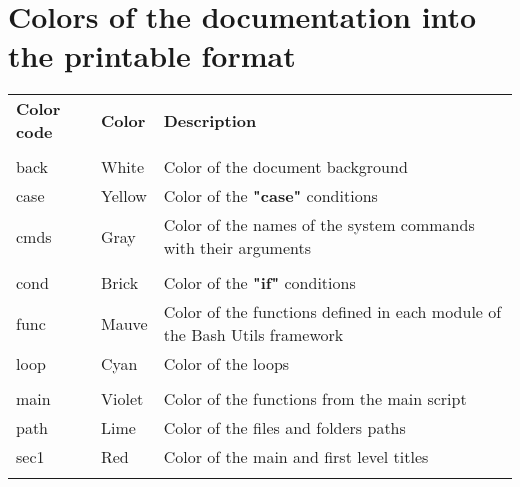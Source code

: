 \documentclass[a4paper,10pt]{article}
\begin{document}
    \newpage





    \color{red}
    \section{Colors of the documentation into the printable format}\color{text}

    \begin{justify}
        \begin{tabular}{lll}
            \textbf{Color code} & \textbf{Color}        & \textbf{Description}\\\\

            \color{text}back    & \color{text}White     & \color{text}Color of the document background\\
            \color{case}case    & \color{case}Yellow    & \color{case}Color of the \textbf{"case"} conditions\\
            \color{cmds}cmds    & \color{cmds}Gray      & \color{cmds}Color of the names of the system commands with their arguments\\\\

            \color{cond}cond    & \color{cond}Brick     & \color{cond}Color of the \textbf{"if"} conditions\\
            \color{func}func    & \color{func}Mauve     & \color{func}Color of the functions defined in each module of the Bash Utils framework\\
            \color{loop}loop    & \color{loop}Cyan      & \color{loop}Color of the loops\\\\

            \color{main}main    & \color{main}Violet    & \color{main}Color of the functions from the main script\\
            \color{path}path    & \color{path}Lime      & \color{path}Color of the files and folders paths\\
            \color{sec1}sec1    & \color{sec1}Red       & \color{sec1}Color of the main and first level titles\\\\


\end{tabular}
\end{justify}
\end{document}
